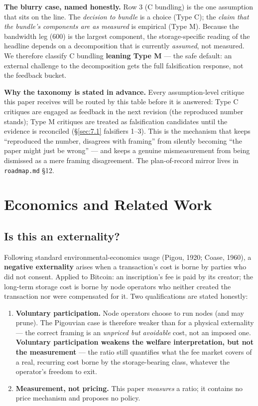 \documentclass[11pt]{article}
\begin{document}
\textbf{The blurry case, named honestly.} Row 3 (C bundling) is the one
assumption that sits on the line. The \emph{decision to bundle} is a choice
(Type C); the \emph{claim that the bundle's components are as measured} is
empirical (Type M). Because the bandwidth leg (600) is the largest component, the
storage-specific reading of the headline depends on a decomposition that is
currently \emph{assumed}, not measured. We therefore classify C bundling
\textbf{leaning Type M} --- the safe default: an external challenge to the
decomposition gets the full falsification response, not the feedback bucket.

\textbf{Why the taxonomy is stated in advance.} Every assumption-level critique
this paper receives will be routed by this table before it is answered: Type C
critiques are engaged as feedback in the next revision (the reproduced number
stands); Type M critiques are treated as falsification candidates until the
evidence is reconciled (\S\ref{sec:7.1} falsifiers 1--3). This is the mechanism
that keeps ``reproduced the number, disagrees with framing'' from silently
becoming ``the paper might just be wrong'' --- and keeps a genuine mismeasurement
from being dismissed as a mere framing disagreement. The plan-of-record mirror
lives in \texttt{roadmap.md} \S12.


\section{Economics and Related Work}\label{sec:8}
\subsection{Is this an externality?}\label{sec:8.1}
Following standard environmental-economics usage (Pigou, 1920; Coase, 1960), a \textbf{negative externality} arises when a transaction's cost is borne by parties who did not consent. Applied to Bitcoin: an inscription's fee is paid by its creator; the long-term storage cost is borne by node operators who neither created the transaction nor were compensated for it. Two qualifications are stated honestly:
\begin{enumerate}[nosep]
  \item \textbf{Voluntary participation.} Node operators choose to run nodes (and may prune). The Pigouvian case is therefore weaker than for a physical externality --- the correct framing is an \emph{unpriced but avoidable} cost, not an imposed one. \textbf{Voluntary participation weakens the welfare interpretation, but not the measurement} --- the ratio still quantifies what the fee market covers of a real, recurring cost borne by the storage-bearing class, whatever the operator's freedom to exit.
  \item \textbf{Measurement, not pricing.} This paper \emph{measures} a ratio; it contains no price mechanism and proposes no policy.
\end{enumerate}
\end{document}
